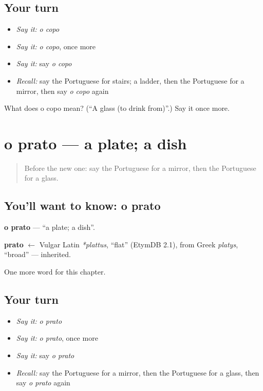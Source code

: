 \subsection*{Your turn}
\begin{itemize}
\raggedright
  \item \emph{Say it:} \emph{o copo}
  \item \emph{Say it:} \emph{o copo}, once more
  \item \emph{Say it:} say \emph{o copo}
  \item \emph{Recall:} say the Portuguese for stairs; a ladder, then the Portuguese for a mirror, then say \emph{o copo} again
\end{itemize}

\begin{tcolorbox}[breakable,colback=teal!4,colframe=teal!35!black,title={Before you move on}]
What does o copo mean? (\textquotedblleft{}A glass (to drink from)\textquotedblright{}.) Say it once more.
\end{tcolorbox}
\section[o prato]{o prato — a plate; a dish}

\label{lesson:PT-C51-prato}



\begin{quote}
Before the new one: say the Portuguese for a mirror, then the Portuguese for a glass.
\end{quote}

\subsection*{You'll want to know: o prato}
\textbf{o prato} — \textquotedblleft{}a plate; a dish\textquotedblright{}.

\begin{cousinweb}
\textbf{prato} $\leftarrow$ Vulgar Latin \emph{*plattus}, \textquotedblleft{}flat\textquotedblright{} (EtymDB 2.1), from Greek \emph{platys}, \textquotedblleft{}broad\textquotedblright{} — inherited.
\end{cousinweb}

\begin{grammarlens}[title={What you've built}]
One more word for this chapter.
\end{grammarlens}

\subsection*{Your turn}
\begin{itemize}
\raggedright
  \item \emph{Say it:} \emph{o prato}
  \item \emph{Say it:} \emph{o prato}, once more
  \item \emph{Say it:} say \emph{o prato}
  \item \emph{Recall:} say the Portuguese for a mirror, then the Portuguese for a glass, then say \emph{o prato} again
\end{itemize}

